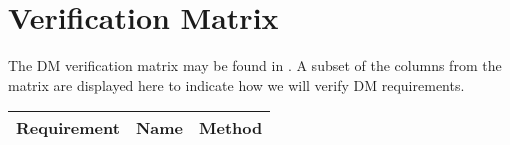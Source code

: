 \section{Verification Matrix} \label{sect:vvm}

The DM verification matrix may be found in . A subset of the columns from the matrix are displayed
here to indicate how we will verify DM requirements.

\small

\begin{longtable}{|l|p{}|l|}
\hline
\textbf{Requirement} & \textbf{Name} &\textbf{Method} \\\hline

\end{longtable}

\normalsize
